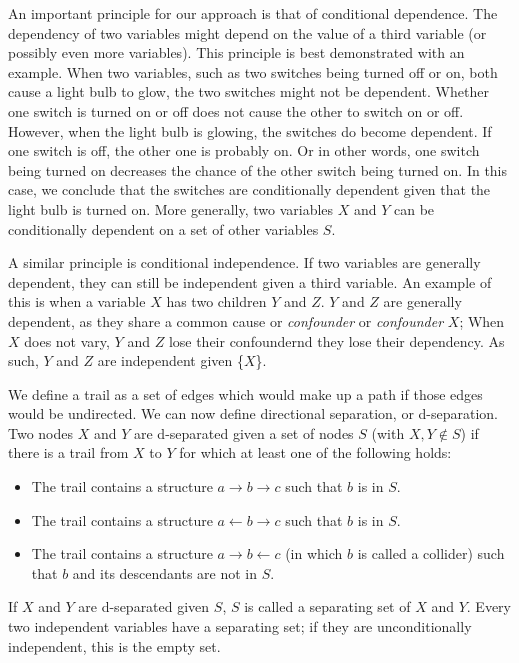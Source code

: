 \documentclass[a4paper, 10pt, english, twocolumn]{article}
\begin{document}
An important principle for our approach is that of conditional dependence.
The dependency of two variables might depend on the value of a third variable (or possibly even more variables).
This principle is best demonstrated with an example.
When two variables, such as two switches being turned off or on, both cause a light bulb to glow, the two switches might not be dependent.
Whether one switch is turned on or off does not cause the other to switch on or off.
However, when the light bulb is glowing, the switches do become dependent.
If one switch is off, the other one is probably on.
Or in other words, one switch being turned on decreases the chance of the other switch being turned on.
In this case, we conclude that the switches are conditionally dependent given that the light bulb is turned on.
More generally, two variables $X$ and $Y$ can be conditionally dependent on a set of other variables $S$. %

A similar principle is conditional independence.
If two variables are generally dependent, they can still be independent given a third variable.
An example of this is when a variable $X$ has two children $Y$ and $Z$.
$Y$ and $Z$ are generally dependent, as they share a common cause or \emph{confounder} or \emph{confounder} $X$;
When $X$ does not vary, $Y$ and $Z$ lose their confoundernd they lose their dependency.
As such, $Y$ and $Z$ are independent given \{$X$\}. 

We define a trail as a set of edges which would make up a path if those edges would be undirected.
We can now define directional separation, or d-separation.
Two nodes $X$ and $Y$ are d-separated given a set of nodes $S$ (with $X, Y \notin S$) if there is a trail from $X$ to $Y$ for which at least one of the following holds:
\begin{itemize}
\item The trail contains a structure $a \rightarrow b \rightarrow c$ such that $b$ is in $S$.
\item The trail contains a structure $a \leftarrow b \rightarrow c$ such that $b$ is in $S$.
\item The trail contains a structure $a \rightarrow b \leftarrow c$ (in which $b$ is called a collider) such that $b$ and its descendants are not in $S$.
\end{itemize}
If $X$ and $Y$ are d-separated given $S$, $S$ is called a separating set of $X$ and $Y$. Every two independent variables have a separating set; if they are unconditionally independent, this is the empty  set.
\end{document}
